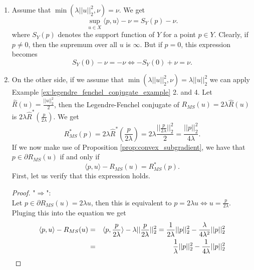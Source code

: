             \begin{enumerate}
                \item Assume that $\min(\lambda ||u||_{2}^{2}, \nu) = \nu$. We get
                    $$
                        \sup_{u \in X} \langle p, u \rangle - \nu = S_{Y}(p) - \nu.
                    $$
                where $S_{Y}(p)$ denotes the support function of $Y$ for a point $p \in Y$. Clearly, if $p \neq 0$, then the supremum over all $u$ is $\infty$. But if $p = 0$, this expression becomes
                    $$
                        S_{Y}(0) - \nu = - \nu \Longleftrightarrow -S_{Y}(0) + \nu = \nu.
                    $$
                \item On the other side, if we assume that $\min(\lambda ||u||_{2}^{2}, \nu) = \lambda ||u||_{2}^{2}$ we can apply Example \ref{ex:legendre_fenchel_conjugate_example} 2. and 4. Let $\hat{R}(u) = \frac{||u||_{2}^{2}}{2}$, then the Legendre-Fenchel conjugate of $R_{MS}(u) = 2\lambda \hat{R}(u)$ is $2\lambda \hat{R}^{\ast}(\frac{p}{2\lambda})$. We get
                    \begin{equation}
                        R_{MS}^{\ast}(p) = 2\lambda \hat{R}^{\ast}(\frac{p}{2\lambda}) = 2\lambda \frac{||\frac{p}{2\lambda}||_{2}^{2}}{2} = \frac{||p||_{2}^{2}}{4\lambda}.
                    \label{eq:mumford_shah_convex_conjugate}
                    \end{equation}
                If we now make use of Proposition \ref{prop:convex_subgradient}, we have that $p \in \partial R_{MS}(u)$ if and only if
                    $$
                        \langle p, u \rangle - R_{MS}(u) = R_{MS}^{\ast}(p).
                    $$
                First, let us verify that this expression holds.
                    \begin{proof}
                        "$\Longrightarrow$":\\
                        Let $p \in \partial R_{MS}(u) = 2\lambda u$, then this is equivalent to $p = 2\lambda u \Longleftrightarrow u = \frac{p}{2\lambda}$. Pluging this into the equation we get
                            \begin{eqnarray}
                                \langle p, u \rangle - R_{MS}(u) &=& \langle p, \frac{p}{2\lambda} \rangle - \lambda||\frac{p}{2\lambda}||_{2}^{2} = \frac{1}{2\lambda} ||p||_{2}^{2} - \frac{\lambda}{4\lambda^{2}} ||p||_{2}^{2} \notag \\
                                &=& \frac{1}{\lambda} ||p||_{2}^{2} - \frac{1}{4\lambda} ||p||_{2}^{2} \notag \\

\end{eqnarray}
\end{proof}
\end{enumerate}
